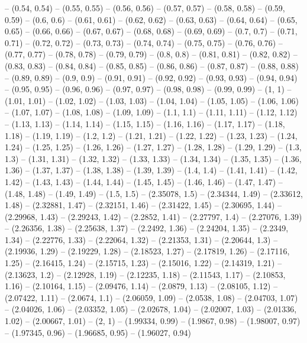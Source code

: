 -- (0.54, 0.54)
-- (0.55, 0.55)
-- (0.56, 0.56)
-- (0.57, 0.57)
-- (0.58, 0.58)
-- (0.59, 0.59)
-- (0.6, 0.6)
-- (0.61, 0.61)
-- (0.62, 0.62)
-- (0.63, 0.63)
-- (0.64, 0.64)
-- (0.65, 0.65)
-- (0.66, 0.66)
-- (0.67, 0.67)
-- (0.68, 0.68)
-- (0.69, 0.69)
-- (0.7, 0.7)
-- (0.71, 0.71)
-- (0.72, 0.72)
-- (0.73, 0.73)
-- (0.74, 0.74)
-- (0.75, 0.75)
-- (0.76, 0.76)
-- (0.77, 0.77)
-- (0.78, 0.78)
-- (0.79, 0.79)
-- (0.8, 0.8)
-- (0.81, 0.81)
-- (0.82, 0.82)
-- (0.83, 0.83)
-- (0.84, 0.84)
-- (0.85, 0.85)
-- (0.86, 0.86)
-- (0.87, 0.87)
-- (0.88, 0.88)
-- (0.89, 0.89)
-- (0.9, 0.9)
-- (0.91, 0.91)
-- (0.92, 0.92)
-- (0.93, 0.93)
-- (0.94, 0.94)
-- (0.95, 0.95)
-- (0.96, 0.96)
-- (0.97, 0.97)
-- (0.98, 0.98)
-- (0.99, 0.99)
-- (1, 1)
-- (1.01, 1.01)
-- (1.02, 1.02)
-- (1.03, 1.03)
-- (1.04, 1.04)
-- (1.05, 1.05)
-- (1.06, 1.06)
-- (1.07, 1.07)
-- (1.08, 1.08)
-- (1.09, 1.09)
-- (1.1, 1.1)
-- (1.11, 1.11)
-- (1.12, 1.12)
-- (1.13, 1.13)
-- (1.14, 1.14)
-- (1.15, 1.15)
-- (1.16, 1.16)
-- (1.17, 1.17)
-- (1.18, 1.18)
-- (1.19, 1.19)
-- (1.2, 1.2)
-- (1.21, 1.21)
-- (1.22, 1.22)
-- (1.23, 1.23)
-- (1.24, 1.24)
-- (1.25, 1.25)
-- (1.26, 1.26)
-- (1.27, 1.27)
-- (1.28, 1.28)
-- (1.29, 1.29)
-- (1.3, 1.3)
-- (1.31, 1.31)
-- (1.32, 1.32)
-- (1.33, 1.33)
-- (1.34, 1.34)
-- (1.35, 1.35)
-- (1.36, 1.36)
-- (1.37, 1.37)
-- (1.38, 1.38)
-- (1.39, 1.39)
-- (1.4, 1.4)
-- (1.41, 1.41)
-- (1.42, 1.42)
-- (1.43, 1.43)
-- (1.44, 1.44)
-- (1.45, 1.45)
-- (1.46, 1.46)
-- (1.47, 1.47)
-- (1.48, 1.48)
-- (1.49, 1.49)
-- (1.5, 1.5)
-- (2.35078, 1.5)
-- (2.34344, 1.49)
-- (2.33612, 1.48)
-- (2.32881, 1.47)
-- (2.32151, 1.46)
-- (2.31422, 1.45)
-- (2.30695, 1.44)
-- (2.29968, 1.43)
-- (2.29243, 1.42)
-- (2.2852, 1.41)
-- (2.27797, 1.4)
-- (2.27076, 1.39)
-- (2.26356, 1.38)
-- (2.25638, 1.37)
-- (2.2492, 1.36)
-- (2.24204, 1.35)
-- (2.2349, 1.34)
-- (2.22776, 1.33)
-- (2.22064, 1.32)
-- (2.21353, 1.31)
-- (2.20644, 1.3)
-- (2.19936, 1.29)
-- (2.19229, 1.28)
-- (2.18523, 1.27)
-- (2.17819, 1.26)
-- (2.17116, 1.25)
-- (2.16415, 1.24)
-- (2.15715, 1.23)
-- (2.15016, 1.22)
-- (2.14319, 1.21)
-- (2.13623, 1.2)
-- (2.12928, 1.19)
-- (2.12235, 1.18)
-- (2.11543, 1.17)
-- (2.10853, 1.16)
-- (2.10164, 1.15)
-- (2.09476, 1.14)
-- (2.0879, 1.13)
-- (2.08105, 1.12)
-- (2.07422, 1.11)
-- (2.0674, 1.1)
-- (2.06059, 1.09)
-- (2.0538, 1.08)
-- (2.04703, 1.07)
-- (2.04026, 1.06)
-- (2.03352, 1.05)
-- (2.02678, 1.04)
-- (2.02007, 1.03)
-- (2.01336, 1.02)
-- (2.00667, 1.01)
-- (2, 1)
-- (1.99334, 0.99)
-- (1.9867, 0.98)
-- (1.98007, 0.97)
-- (1.97345, 0.96)
-- (1.96685, 0.95)
-- (1.96027, 0.94)
